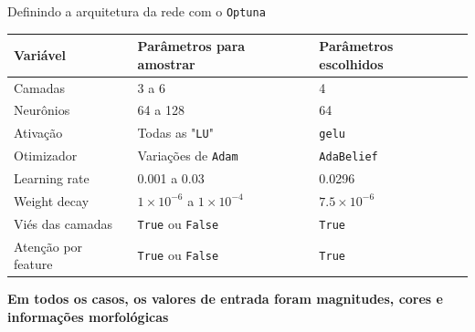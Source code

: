 \begin{frame}[c]{Definindo a arquitetura da rede com o \texttt{Optuna}}
    \begin{table}
        \centering
        \begin{tabular}{@{}lll@{}}
            \toprule
            \textbf{Variável}   & \textbf{Parâmetros para amostrar}     & \textbf{Parâmetros escolhidos} \\ \midrule
            Camadas             & 3 a 6                                 & 4                              \\
            Neurônios           & 64 a 128                              & 64                             \\
            Ativação            & Todas as "\texttt{LU}"                  & \texttt{gelu}                  \\
            Otimizador          & Variações de \texttt{Adam}            & \texttt{AdaBelief}             \\
            Learning rate       & 0.001 a 0.03                          & 0.0296                         \\
            Weight decay        & $1 \times 10^{-6}$ a $1 \times 10^{-4}$ & $7.5 \times 10^{-6}$           \\
            Viés das camadas    & \texttt{True} ou \texttt{False}       & \texttt{True}                  \\
            Atenção por feature & \texttt{True} ou \texttt{False}       & \texttt{True}                  \\ \bottomrule
        \end{tabular}
    \end{table}

    \begin{tcolorbox}
        \textbf{Em todos os casos, os valores de entrada foram magnitudes, cores e informações morfológicas}
    \end{tcolorbox}

\end{frame}

